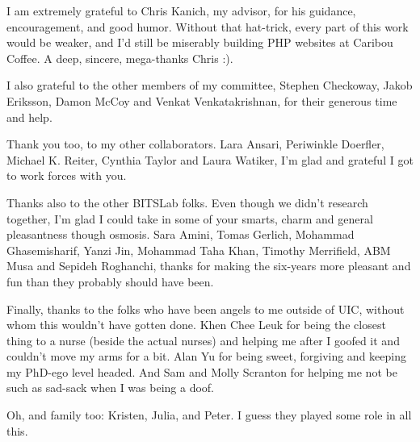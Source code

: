 \acknowledgment
I am extremely grateful to Chris Kanich, my advisor, for his guidance,
encouragement, and good humor.  Without that hat-trick, every part of this
work would be weaker, and I'd still be miserably building PHP websites
at Caribou Coffee.  A deep, sincere, mega-thanks Chris :).

I also grateful to the other members of my committee, Stephen Checkoway,
Jakob Eriksson, Damon McCoy and Venkat Venkatakrishnan, for their generous
time and help.

Thank you too, to my other collaborators. Lara Ansari,
Periwinkle Doerfler, Michael K. Reiter, Cynthia Taylor and Laura Watiker,
I'm glad and grateful I got to work forces with you.

Thanks also to the other BITSLab folks.  Even though we didn't research
together, I'm glad I could take in some of your smarts, charm and general
pleasantness though osmosis. Sara Amini, Tomas Gerlich, Mohammad Ghasemisharif,
Yanzi Jin, Mohammad Taha Khan, Timothy Merrifield, ABM Musa and Sepideh
Roghanchi, thanks for making the six-years more pleasant and fun than they
probably should have been.

Finally, thanks to the folks who have been angels to me outside of UIC, without
whom this wouldn't have gotten done. Khen Chee Leuk for being the closest thing
to a nurse (beside the actual nurses) and helping me after I goofed it
and couldn't move my arms for a bit.  Alan Yu for being sweet,
forgiving and keeping my PhD-ego level headed.  And Sam and
Molly Scranton for helping me not be such as sad-sack when I was being a doof.

Oh, and family too: Kristen, Julia, and Peter.  I guess they played some
role in all this.
